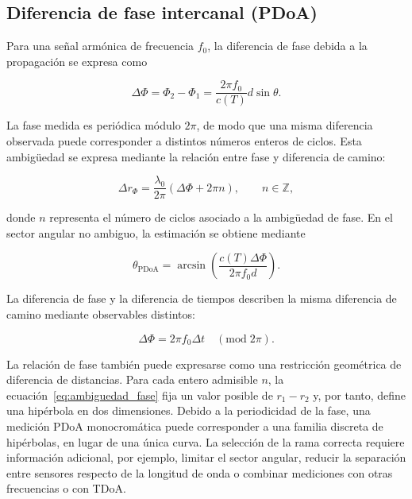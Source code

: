 \subsection{Diferencia de fase intercanal (PDoA)}

Para una señal armónica de frecuencia $f_0$, la diferencia de fase
debida a la propagación se expresa como

\begin{equation}
    \Delta\Phi = \Phi_2-\Phi_1 =
    \frac{2\pi f_0}{c(T)}d\sin\theta.
    \label{eq:diferencia_fase_intercanal}
\end{equation}

La fase medida es periódica módulo $2\pi$, de modo que una misma
diferencia observada puede corresponder a distintos números enteros
de ciclos. Esta ambigüedad se expresa mediante la relación entre fase
y diferencia de camino:

\begin{equation}
    \Delta r_{\Phi} =
    \frac{\lambda_0}{2\pi}
    \left(\Delta\Phi+2\pi n\right),
    \qquad n\in\mathbb{Z},
    \label{eq:ambiguedad_fase}
\end{equation}

donde $n$ representa el número de ciclos asociado a la ambigüedad de
fase. En el sector angular no ambiguo, la estimación se obtiene
mediante

\begin{equation}
    \theta_{\mathrm{PDoA}} =
    \arcsin\left(
    \frac{c(T)\Delta\Phi}{2\pi f_0d}
    \right).
    \label{eq:inversion_angular_fase}
\end{equation}

La diferencia de fase y la diferencia de tiempos describen la misma
diferencia de camino mediante observables distintos:

\begin{equation}
    \Delta\Phi = 2\pi f_0\Delta t
    \quad (\mathrm{mod}\;2\pi).
    \label{eq:relacion_fase_tiempo}
\end{equation}

La relación de fase también puede expresarse como una restricción
geométrica de diferencia de distancias. Para cada entero admisible
$n$, la ecuación~\eqref{eq:ambiguedad_fase} fija un valor posible de
$r_1-r_2$ y, por tanto, define una hipérbola en dos dimensiones. Debido
a la periodicidad de la fase, una medición PDoA monocromática puede
corresponder a una familia discreta de hipérbolas, en lugar de una
única curva. La selección de la rama correcta requiere información
adicional, por ejemplo, limitar el sector angular, reducir la
separación entre sensores respecto de la longitud de onda o combinar
mediciones con otras frecuencias o con TDoA.

